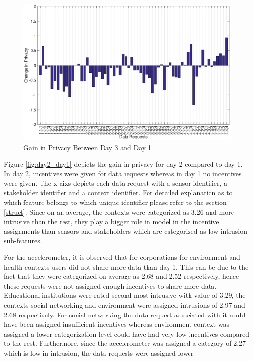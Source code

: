 \begin{figure}[ht!]
\centering
\includegraphics[width=\textwidth]{./images/day3_day1}
\caption{Gain in Privacy Between Day 3 and Day 1}
\label{fig:day3_day1}
\end{figure}

Figure \ref{fig:day2_day1} depicts the gain in privacy for day 2 compared to day 1. In day 2, incentives were given for data requests whereas in day 1 no incentives were given. The x-aixs depicts each data request with a sensor identifier, a stakeholder identifier and a context identifier. For detailed explanation as to which feature belongs to which unique identifier please refer to the section \ref{struct}. Since on an average, the contexts were categorized as 3.26 and more intrusive than the rest, they play a bigger role in model in the incentive assignments than sensors and stakeholders which are categorized as low intrusion sub-features. 

For the accelerometer, it is observed that for corporations for environment and health contexts users did not share more data than day 1. This can be due to the fact that they were categorized on average as 2.68 and 2.52 respectively, hence these requests were not assigned enough incentives to share more data. Educational institutions were rated second most intrusive with value of 3.29, the contexts social networking and environment were assigned intrusions of 2.97 and 2.68 respectively. For social networking the data request associated with it could have been assigned insufficient incentives whereas environment context was assigned a lower categorization level could have had very low incentives compared to the rest. Furthermore, since the accelerometer was assigned a category of 2.27 which is low in intrusion, the data requests were assigned lower 

